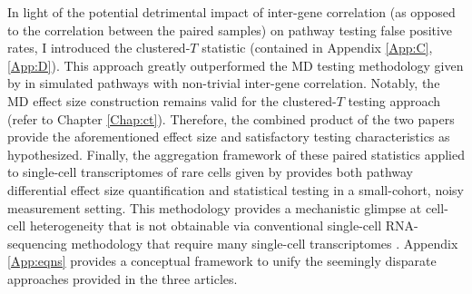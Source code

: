 In light of the potential detrimental impact \citep{Tamayo2016} of inter-gene correlation (as opposed to the correlation between the paired samples) on pathway testing false positive rates, I introduced the clustered-$T$ statistic (contained in Appendix \ref{App:C}, \ref{App:D}). This approach greatly outperformed the MD testing methodology given by \citet{Schissler2015} in simulated pathways with non-trivial inter-gene correlation. Notably, the MD effect size construction remains valid for the clustered-$T$ testing approach (refer to Chapter \ref{Chap:ct}). Therefore, the combined product of the two papers provide the aforementioned effect size and satisfactory testing characteristics as hypothesized. Finally, the aggregation framework of these paired statistics applied to single-cell transcriptomes of rare cells given by \citet{Schissler2016} provides both pathway differential effect size quantification and statistical testing in a small-cohort, noisy measurement setting. This methodology provides a mechanistic glimpse at cell-cell heterogeneity that is not obtainable via conventional single-cell RNA-sequencing methodology that require many single-cell transcriptomes \citep{Ding2015, Grun2014}. Appendix \ref{App:eqns} provides a conceptual framework to unify the seemingly disparate approaches provided in the three articles.


